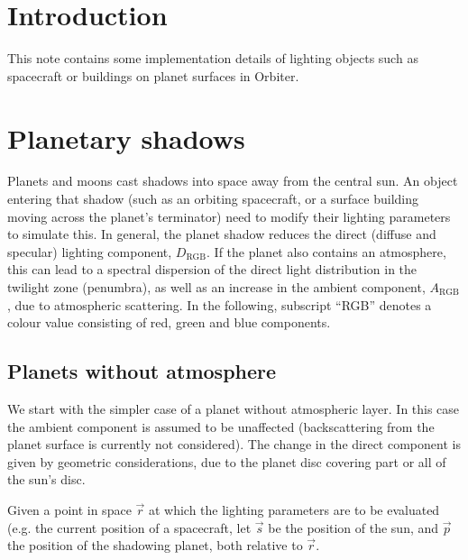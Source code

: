 \documentclass[a4paper]{article}
\begin{document}



\newcommand{\vR}[1]{\ensuremath{\vec{R}_{#1}}}
\newcommand{\nR}[1]{\ensuremath{|\vR{#1}|}}
\newcommand{\mat}[1]{\ensuremath{\mathsf{#1}}}

\maketitle

\section{Introduction}
This note contains some implementation details of lighting objects such as spacecraft or buildings on planet surfaces in Orbiter.

\section{Planetary shadows}
Planets and moons cast shadows into space away from the central sun. An object entering that shadow (such as an orbiting spacecraft, or a surface building moving across the planet's terminator) need to modify their lighting parameters to simulate this. In general, the planet shadow reduces the direct (diffuse and specular) lighting component, $D_\text{RGB}$. If the planet also contains an atmosphere, this can lead to a spectral dispersion of the direct light distribution in the twilight zone (penumbra), as well as an increase in the ambient component, $A_\text{RGB}$, due to atmospheric scattering. In the following, subscript ``RGB'' denotes a colour value consisting of red, green and blue components.

\subsection{Planets without atmosphere}
We start with the simpler case of a planet without atmospheric layer. In this case the ambient component is assumed to be unaffected (backscattering from the planet surface is currently not considered). The change in the direct component is given by geometric considerations, due to the planet disc covering part or all of the sun's disc.

Given a point in space $\vec{r}$ at which the lighting parameters are to be evaluated (e.g. the current position of a spacecraft, let $\vec{s}$ be the position of the sun, and $\vec{p}$ the position of the shadowing planet, both relative to $\vec{r}$.
\end{document}
